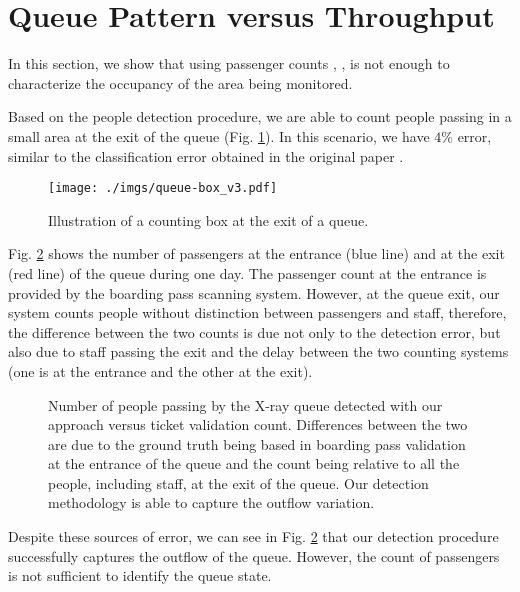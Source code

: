 \section{Queue Pattern versus Throughput}
\label{sec:params}
%
In this section, we show that using passenger counts \cite{denman2015automatic}, \cite{felkel2012comprehensive}, is not enough to characterize the occupancy of the area being monitored.

Based on the people detection procedure, we are able to count people passing in a small area at the exit of the queue (Fig. \ref{fig:queue-box}). 
In this scenario, we have $4\%$ error, similar to the classification error obtained in the original paper \cite{carvalho2016detecting}.
%
\begin{figure}[bht]
\centering
\texttt{[image: ./imgs/queue-box\_v3.pdf]}
\caption{Illustration of a counting box at the exit of a queue.}
\label{fig:queue-box}
\end{figure}
%
Fig. \ref{fig:dashboard_valid} shows the number of passengers at the entrance (blue line) and at the exit (red line) of the queue during one day. 
The passenger count at the entrance is provided by the boarding pass scanning system. However, at the queue exit, our system counts people without distinction between passengers and staff, therefore, the difference between the two counts is due not only to the detection error, but also due to staff passing the exit and the delay between the two counting systems (one is at the entrance and the other at the exit).
%
\begin{figure}[bth]
\centering
{}
\caption{Number of people passing by the X-ray queue detected with our approach versus ticket validation count. Differences between the two are due to the ground truth being based in boarding pass validation at the entrance of the queue and the count being relative to all the people, including staff, at the exit of the queue. Our detection methodology is able to capture the outflow variation.}
\label{fig:dashboard_valid}
\end{figure}
%
Despite these sources of error, we can see in Fig. \ref{fig:dashboard_valid} that our detection procedure successfully captures the outflow of the queue.
However, the count of passengers is not sufficient to identify the queue state.

